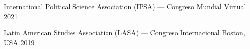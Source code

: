 \begin{cvhonors}
\cvconf
{International Political Science Association (IPSA) --- Congreso Mundial} 
{Virtual}
{2021}
\end{cvhonors}

\begin{cvhonors}
\cvconf
{Latin American Studies Association (LASA) --- Congreso Internacional} 
{Boston, USA}
{2019}
\end{cvhonors}











